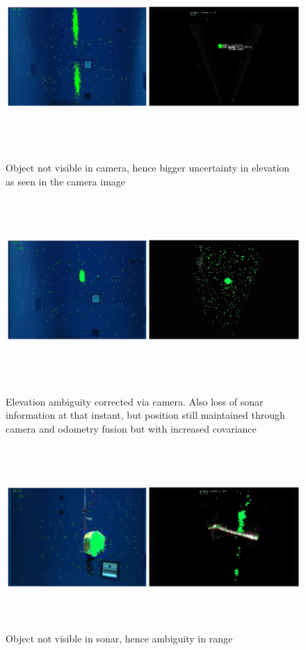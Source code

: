 \documentclass[15pt]{article}
\begin{document}
\begin{figure}
  \includegraphics[width=\textwidth,height=7cm]{pfraw3}
  \caption{Object not visible in camera, hence bigger uncertainty in elevation as seen in the camera image}
  \includegraphics[width=\textwidth,height=7cm]{pfraw4}
  \captionsetup{font=small,skip=-10pt,justification=centering}
  \caption{Elevation ambiguity corrected via camera. Also loss of sonar information at that instant, but position still maintained through camera and odometry fusion but with increased covariance}
  \includegraphics[width=\textwidth,height=7cm]{pfraw5}
  \captionsetup{font=small,skip=-10pt,justification=centering}
  \caption{Object not visible in sonar, hence ambiguity in range}
\end{figure}
\end{document}

